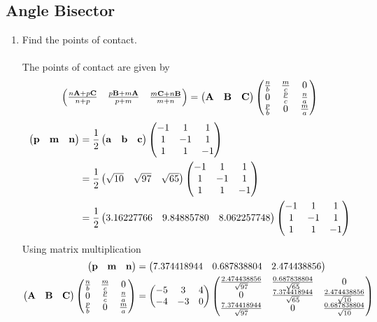 \documentclass[10pt]{book}
\begin{document}
\subsection{Angle Bisector}
\begin{enumerate}[label=\thesubsection.\arabic*.,ref=\thesubsection.\theenumi]
\item Find the points of contact. \\ 
\solution\\
The points of contact are given by 
\begin{align}
\begin{pmatrix}	\frac{n\mathbf{A}+p\mathbf{C}}{n+p}
&
\frac{p\mathbf{B}+m\mathbf{A}}{p+m}
&
\frac{m\mathbf{C}+n\mathbf{B}}{m+n}
\end{pmatrix}
= 	\begin{pmatrix}\mathbf{A} & \mathbf{B} &\mathbf{C}\end{pmatrix}\begin{pmatrix}\frac{n}{b} & \frac{m}{c} & 0\\0 & \frac{p}{c} & \frac{n}{a} \\\frac{p}{b} & 0 & \frac{m}{a}\end{pmatrix}
\end{align}
\begin{align}
    \begin{pmatrix}\mathbf{p} & \mathbf{m} & \mathbf{n} \end{pmatrix} &=\frac{1}{2} \begin{pmatrix}\mathbf{a} & \mathbf{b} & \mathbf{c}\end{pmatrix} \begin{pmatrix} -1 & 1 & 1 \\1 & -1 & 1 \\1 & 1 & -1 \end{pmatrix} \\
   &= \frac{1}{2}\begin{pmatrix} \sqrt{10}&  \sqrt{97} & \sqrt{65} \end{pmatrix}\begin{pmatrix} -1 & 1 & 1 \\1 & -1 & 1 \\1 & 1 & -1 \end{pmatrix}  \\
   &= \frac{1}{2}\begin{pmatrix} 3.16227766& 9.84885780 & 8.062257748 \end{pmatrix}\begin{pmatrix} -1 & 1 & 1 \\1 & -1 & 1 \\1 & 1 & -1 \end{pmatrix}
\end{align}
Using matrix multiplication 
\begin{align}
        \begin{pmatrix}\mathbf{p} & \mathbf{m} & \mathbf{n} \end{pmatrix} &= \begin{pmatrix}7.374418944& 0.687838804 & 2.474438856 \end{pmatrix}   \\
\begin{pmatrix}\mathbf{A} & \mathbf{B} &\mathbf{C}\end{pmatrix}\begin{pmatrix}\frac{n}{b} & \frac{m}{c} & 0\\0 & \frac{p}{c} & \frac{n}{a} \\\frac{p}{b} & 0 & \frac{m}{a}\end{pmatrix} 
  &= \begin{pmatrix}-5 & 3 & 4 \\ -4 & -3 & 0\end{pmatrix} \begin{pmatrix}\frac{2.474438856}{\sqrt{97}} & \frac{0.687838804 }{\sqrt{65}} & 0\\0 & \frac{7.374418944}{\sqrt{65}} & \frac{2.474438856}{\sqrt{10}} \\\frac{7.374418944}{\sqrt{97}} & 0 & \frac{0.687838804 }{\sqrt{10}}\end{pmatrix}
\end{align}

\end{enumerate}
\end{document}
